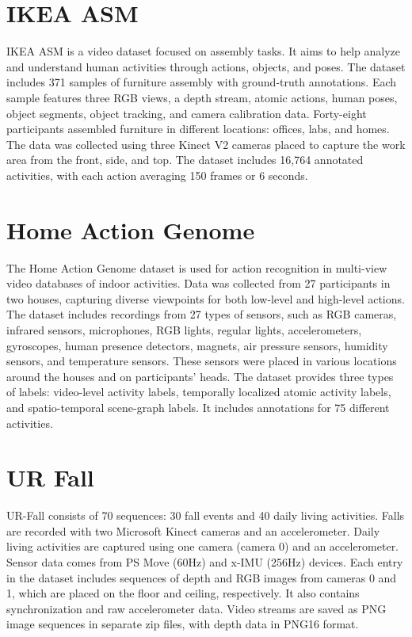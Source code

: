 \section{IKEA ASM}
IKEA ASM \parencite{IKEA} is a video dataset focused on assembly tasks. It aims to help analyze and understand human activities through actions, objects, and poses. The dataset includes 371 samples of furniture assembly with ground-truth annotations. Each sample features three RGB views, a depth stream, atomic actions, human poses, object segments, object tracking, and camera calibration data. Forty-eight participants assembled furniture in different locations: offices, labs, and homes. The data was collected using three Kinect V2 cameras placed to capture the work area from the front, side, and top. The dataset includes 16,764 annotated activities, with each action averaging 150 frames or 6 seconds.

\section{Home Action Genome}
The Home Action Genome dataset \parencite{home-action-genome} is used for action recognition in multi-view video databases of indoor activities. Data was collected from 27 participants in two houses, capturing diverse viewpoints for both low-level and high-level actions. The dataset includes recordings from 27 types of sensors, such as RGB cameras, infrared sensors, microphones, RGB lights, regular lights, accelerometers, gyroscopes, human presence detectors, magnets, air pressure sensors, humidity sensors, and temperature sensors. These sensors were placed in various locations around the houses and on participants' heads. The dataset provides three types of labels: video-level activity labels, temporally localized atomic activity labels, and spatio-temporal scene-graph labels. It includes annotations for 75 different activities.

\section{UR Fall}
UR-Fall consists of 70 sequences: 30 fall events and 40 daily living activities. Falls are recorded with two Microsoft Kinect cameras and an accelerometer. Daily living activities are captured using one camera (camera 0) and an accelerometer. Sensor data comes from PS Move (60Hz) and x-IMU (256Hz) devices. Each entry in the dataset includes sequences of depth and RGB images from cameras 0 and 1, which are placed on the floor and ceiling, respectively. It also contains synchronization and raw accelerometer data. Video streams are saved as PNG image sequences in separate zip files, with depth data in PNG16 format. 

